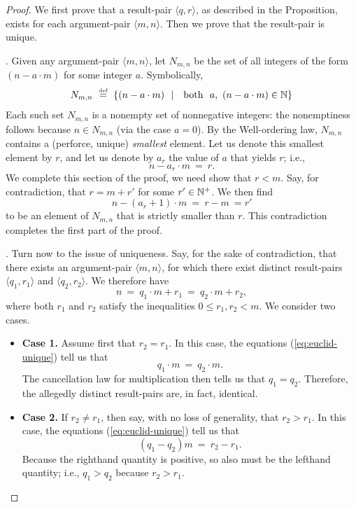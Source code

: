 \begin{proof}
We first prove that a result-pair $\langle q, r \rangle$, as described in the Proposition, exists for each argument-pair $\langle m, n \rangle$.  Then we prove that the result-pair is unique.

\medskip

.
Given any argument-pair $\langle m, n \rangle$, let $N_{m,n}$ be the set of all integers of the form $(n - a \cdot m)$ for some integer $a$.  Symbolically,
\[ N_{m,n} \ \stackrel{\mbox{{\tiny def}}}{=} \ \{ (n - a \cdot m) \ \ | \ \  \mbox{ both } \  a,  \
(n - a \cdot m) \in \mathbb{N}  \}
\]
Each such set $N_{m,n}$ is a nonempty set of nonnegative integers: the nonemptiness follows because $n \in N_{m,n}$ (via the case $a=0$).  By the Well-ordering law, $N_{m,n}$ contains a (perforce, unique) {\em smallest} element.  Let us denote this smallest element by $r$, and let us denote by $a_r$ the value of $a$ that yields $r$; i.e.,
\[ n - a_r \cdot m \ = \ r.  \]
We complete this section of the proof, we need show that $r < m$.  Say, for contradiction, that $r = m+r'$ for some $r' \in \mathbb{N}^+$.  We then find
\[ n - (a_r +1)  \cdot m \ = \ r -m \ = r' \]
to be an element of $N_{m,n}$ that is strictly smaller than $r$.  This contradiction completes the first part of the proof.

\medskip

.
Turn now to the issue of uniqueness.  Say, for the sake of contradiction, that there exists an argument-pair $\langle m, n \rangle$, for which there exist distinct result-pairs $\langle q_1, r_1 \rangle$ and $\langle q_2, r_2 \rangle$.  We therefore have
\begin{equation}
\label{eq:euclid-unique}
n \ = \ q_1 \cdot m + r_1 \ = \ q_2 \cdot m + r_2,
\end{equation}
where both $r_1$ and $r_2$ satisfy the inequalities $0 \leq r_1, r_2 <m$.  We consider two cases.
\begin{itemize}
\item \textbf{Case 1.}
Assume first that $r_2 = r_1$.  In this case, the equations (\ref{eq:euclid-unique}) tell us that
\[ q_1 \cdot m \ = \ q_2 \cdot m. \]
The cancellation law for multiplication then tells us that $q_1 = q_2$.  Therefore, the allegedly distinct result-pairs are, in fact, identical.

\item \textbf{Case 2.}
If $r_2 \neq r_1$, then say, with no loss of generality, that $r_2 > r_1$.  In this case, the equations (\ref{eq:euclid-unique}) tell us that
\[ (q_1 - q_2) m \ = \ r_2 - r_1 . \]
Because the righthand quantity is positive, so also must be the lefthand quantity; i.e., $q_1 > q_2$ because $r_2 > r_1$.


\end{itemize}
\end{proof}
